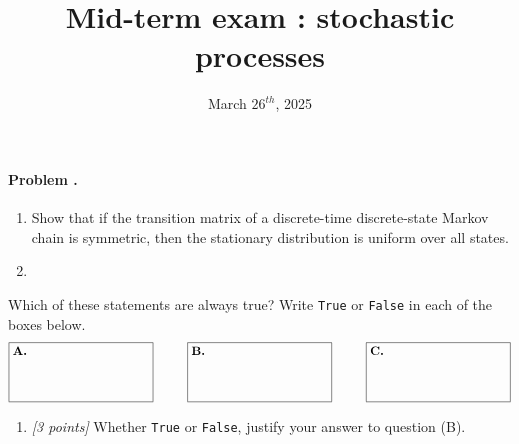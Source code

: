\documentclass[article,12pt,a4paper]{article}
\title{ \bfseries \Huge {Mid-term exam : stochastic processes}}
\date{March $26^{th}$, 2025}
\newcounter{num}  %
\begin{document}
	
	\setcounter{num}{1}  %
		
		\paragraph{Problem \thenum.}
		\begin{enumerate}
			\item Show that if the transition matrix of a discrete-time discrete-state Markov chain is symmetric, then the stationary distribution is
			uniform over all states.
			\item
		\end{enumerate}
		
		Which of these statements are always true? Write \texttt{True} or \texttt{False} in each of the boxes below.
		\[
		\fbox{\parbox[c][1.5cm][t]{4cm}{\textbf{A.} \hspace{0.5cm}}} \hspace{1cm} 
		\fbox{\parbox[c][1.5cm][t]{4cm}{\textbf{B.} \hspace{0.5cm}}} \hspace{1cm} 
		\fbox{\parbox[c][1.5cm][t]{4cm}{\textbf{C.} \hspace{0.5cm}}}
		\]
		
		\begin{enumerate}
			\item \textit{[3 points]} Whether \texttt{True} or \texttt{False}, justify your answer to question (B).
		\end{enumerate}
		
		
		\newpage
		
\end{document}

